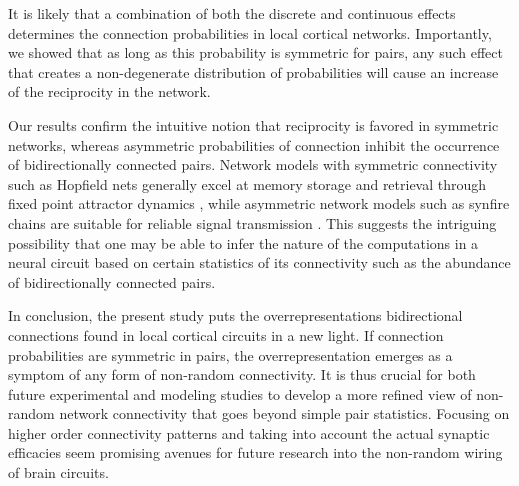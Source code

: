 It is likely that a combination of both the discrete and continuous effects determines the connection probabilities in local cortical networks.
%
Importantly, we showed that as long as this probability is symmetric for pairs, any such effect that creates a non-degenerate distribution of probabilities will cause an increase of the reciprocity in the network.

%

Our results confirm the intuitive notion that reciprocity is favored in symmetric networks, whereas asymmetric probabilities of connection inhibit the occurrence of bidirectionally connected pairs. Network models with symmetric connectivity such as Hopfield nets generally excel at memory storage and retrieval through fixed point attractor dynamics \cite{Hopfield1982}, while asymmetric network models such as synfire chains are suitable for reliable signal transmission \cite{Abeles1982}. This suggests the intriguing possibility that one may be able to infer the nature of the computations in a neural circuit based on certain statistics of its connectivity such as the abundance of bidirectionally connected pairs.

In conclusion, the present study puts the overrepresentations bidirectional connections found in local cortical circuits in a new light.
%
If connection probabilities are symmetric in pairs, the overrepresentation emerges as a symptom of any form of non-random connectivity.
%
It is thus crucial for both future experimental and modeling studies to develop a more refined view of non-random network connectivity that goes beyond simple pair statistics. Focusing on higher order connectivity patterns and taking into account the actual synaptic efficacies seem promising avenues for future research into the non-random wiring of brain circuits.
